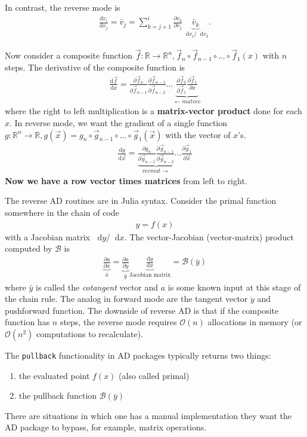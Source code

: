 \documentclass[10pt]{article}
\newcommand{\diff}{\mathop{}\!\tn{d}} %
\newcommand{\pp}[2]{\frac{\partial #1}{\partial #2}}
\newcommand{\dd}[2]{\frac{\textrm{d} #1}{\textrm{d} #2}}
\newcommand{\mbb}[1]{\mathbb{#1}} %
\newcommand{\mcal}[1]{\mathcal{#1}} %
\newcommand{\ben}{\begin{eqnarray*}}
\newcommand{\een}{\end{eqnarray*}}
\newcommand{\beq}{\begin{equation}\begin{aligned}}
\newcommand{\eeq}{\end{aligned}\end{equation}}
\newcommand{\BigO}{\mathcal{O}}
\newcommand{\tn}[1]{\textrm{#1}}
\begin{document}
In contrast, the reverse mode is
\beq
\dd{v_i}{v_j} = \bar{v}_j = \sum_{k=j+1}^{i}{\pp{v_k}{v_j}} \underbrace{\bar{v}_k}_{\diff{v_i}/\diff{v_k}}
.
\eeq

Now consider a composite function $\vec{f}: \mbb{R} \rightarrow \mbb{R}^n, \vec{f}_n \circ \vec{f}_{n-1} \circ \dots \circ \vec{f}_1(x)$ with $n$ steps.
The derivative of the composite function is
\beq
\dd{\vec{f}}{x} = \pp{\vec{f}_n}{\vec{f}_{n-1}} \pp{\vec{f}_{n-1}}{\vec{f}_{n-2}} \dots
\underbrace{\pp{\vec{f}_2}{\vec{f}_1} \pp{\vec{f}_1}{x}}_{\leftarrow matvec}
\eeq
where the right to left multiplication is a \textbf{matrix-vector product} done for each $x$.
In reverse mode, we want the gradient of a single function $g: \mbb{R}^n \rightarrow \mbb{R}, g(\vec{x}) = g_n \circ \vec{g}_{n-1}\circ \dots \circ \vec{g}_1(\vec{x})$ with the vector of $x$'s.
\beq
\dd{g}{\vec{x}}
=
\underbrace{\pp{g_n}{\vec{g}_{n-1}} \pp{\vec{g}_{n-1}}{\vec{g}_{n-2}}}_{vecmat \rightarrow}
\dots  \pp{\vec{g}_1}{\vec{x}}
\eeq
\textbf{Now we have a row vector times matrices} from left to right.

The reverse AD routines are in Julia syntax.
Consider the primal function somewhere in the chain of code
\ben
y = f(x)
\een
with a Jacobian matrix $\diff y/\diff x$.
The vector-Jacobian (vector-matrix) product computed by $\mcal{B}$ is
\ben
\underbrace{\pp{a}{x}}_{\bar{x}} =
\underbrace{\pp{a}{y}}_{\bar{y}}
\underbrace{\dd{y}{x}}_{\tn{Jacobian matrix}}
= \mcal{B}({\bar{y}})
\een
where $\bar{y}$ is called the \emph{cotangent} vector and $a$ is some known input at this stage of the chain rule.
The analog in forward mode are the tangent vector $\dot{y}$ and pushforward function.
The downside of reverse AD is that if the composite function has $n$ steps, the reverse mode requires $\BigO(n)$ allocations in memory (or $\BigO(n^2)$ computations to recalculate).

The \texttt{pullback} functionality in AD packages typically returns two things:
\begin{enumerate}
	\item the evaluated point $f(x)$ (also called primal)
	\item the pullback function $\mcal{B}(\bar{y})$
\end{enumerate}
There are situations in which one has a manual implementation they want the {AD} package to bypass, for example, matrix operations.
\end{document}
